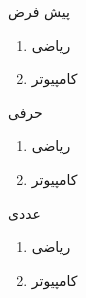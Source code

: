 \begin{plainslide}[شمارنده‌ها]
\begin{block}{پیش فرض}
\begin{enumerate}%
\item ریاضی
\item کامپیوتر
\end{enumerate}
\end{block}
\begin{block}{حرفی}
\begin{enumerate}[ا]
\item ریاضی
\item کامپیوتر
\end{enumerate}
\end{block}
\begin{block}{عددی}
\begin{enumerate}[ی]
\item ریاضی
\item کامپیوتر
\end{enumerate}
\end{block}

\end{plainslide}



